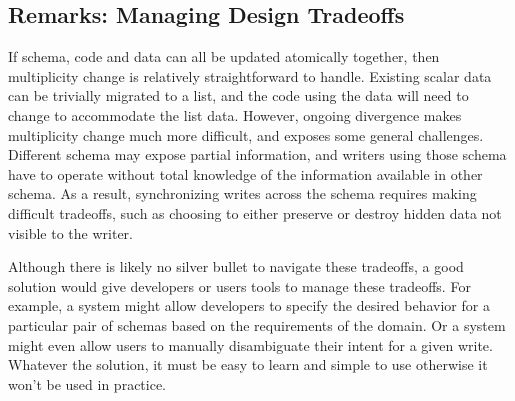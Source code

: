 \documentclass[english,crc]{programming}
\begin{document}
\subsection*{Remarks: Managing Design Tradeoffs}

If schema, code and data can all be updated atomically together, then multiplicity change is
relatively straightforward to handle. Existing scalar data can be trivially migrated to a
list, and the code using the data will need to change to accommodate the list data.
%
However, ongoing divergence makes multiplicity change much more difficult, and exposes
some general challenges. Different schema may expose partial information, and writers using
those schema have to operate without total knowledge of the information available in other schema.
As a result, synchronizing writes across the schema requires making difficult tradeoffs, such as
choosing to either preserve or destroy hidden data not visible to the writer.

Although there is likely no silver bullet to navigate these tradeoffs, a good solution
would give developers or users tools to manage these tradeoffs. For example, a system
might allow developers to specify the desired behavior for a particular pair of schemas based
on the requirements of the domain. Or a system might even allow users to manually
disambiguate their intent for a given write.
Whatever the solution, it must be easy to learn and simple to use otherwise it won't be used in practice.

\end{document}
